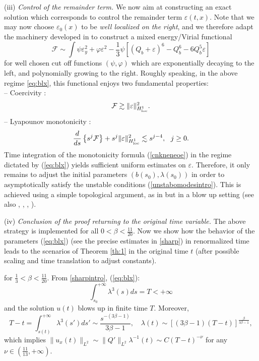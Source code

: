 \documentclass[11pt,a4paper,reqno]{amsart}
\theoremstyle{remark}
\numberwithin{equation}{section}
\newcommand{\be}{\begin{equation}}
\newcommand{\ee}{\end{equation}}
\def\fref#1{{\rm (\ref{#1})}}
\def\e{\varepsilon}
\def\fref#1{{\rm (\ref{#1})}}
\def\l{\lambda}
\def\matchal{\mathcal}
\begin{document}
 \medskip
 
 \noindent (iii) \emph{Control of the remainder term.}  We now aim at constructing an exact solution which  corresponds to   control  the remainder term $\e(t,x)$. Note that we may now choose $\e_0(x)$ to be {\it well localized on the right}, and we therefore adapt the machinery developed in \cite{MMR1} to construct a mixed energy/Virial functional $$\matchal F\sim \int\psi\e_y^2+\varphi\e^2-\frac 13  \psi\left[(Q_b+\e)^6-Q_b^6-6Q_b^5\e\right]$$ for well chosen cut off functions $(\psi,\varphi)$ which are exponentially decaying to the left, and polynomially growing to the right. Roughly speaking, in the above regime \eqref{eq:blx}, this functional enjoys two fundamental properties:
\\
-- Coercivity :
 $$\matchal F \gtrsim \|\e\|_{H^1_{\rm loc}}^2.$$
 -- Lyapounov monotonicity :  
\be
\label{cnkneneoe}
\frac{d}{ds}\left\{s^j {\mathcal F}\right\}+ s^j \|\e\|_{H^1_{\rm loc}}^2
\lesssim s^{j-4}, \ \ j\geq 0.
\ee
Time integration of the monotonicity formula \fref{cnkneneoe} in the regime dictated by \fref{eq:blx} yields  sufficient uniform estimates on $\e$. Therefore, it only remains to adjust the initial parameters $(b(s_0),\l(s_0))$ in order to asymptotically satisfy the unstable conditions \fref{unstabomodesintro}. This is achieved using a simple topological argument, as in \cite{MMC} but in a blow up setting (see also \cite{RH}, \cite{S}, \cite{MRR}, \cite{CoteZaag}).
 
\medskip

\noindent (iv) \emph{Conclusion of the proof returning to the original time variable.} The above strategy is implemented for all $0<\beta<\frac{11}{20}$. Now we show how the behavior of the parameters  \fref{eq:blx} (see the precise estimates in \eqref{sharp}) in renormalized time leads to the  scenarios of Theorem \ref{th:1} in the original time $t$  (after possible scaling and time translation to adjust constants).

\smallskip

for 
$
\frac 13 < \beta < \frac {11}{20}.
$
From \eqref{sharpintro}, \fref{eq:blx}: $$\int_{s_0}^{+\infty}    {\l^3(s)} ds=T<+\infty$$ and the 
solution $u(t)$ blows up in finite time $T$.
Moreover,
$$  T-t=\int_{s(t)}^{+\infty}{\l^3(s')}{ds'} 
\sim \frac {s^{ -( 3 \beta-1)}}{3\beta-1}  , \quad \l(t) \sim  \left[ (3\beta-1)(T-t)\right]^{\frac {\beta}{3\beta-1}}, 
$$
which implies  $\|u_x(t)\|_{L^2} \sim \|Q'\|_{L^2} \l^{-1} (t) \sim C (T-t)^{-\nu}$ for any $\nu\in (\frac {11}{13},+\infty).$ 
\end{document}
